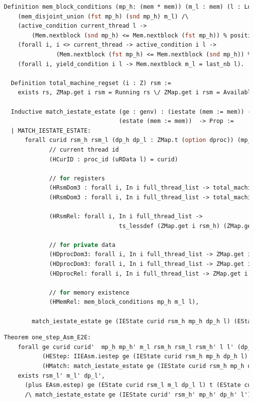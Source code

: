 \begin{lstlisting}[language=Caml]
  Definition mem_block_conditions (mp_h: (mem * mem)) (m_l : mem) (l : Log) : Prop :=
    (mem_disjoint_union (fst mp_h) (snd mp_h) m_l) /\
    (active_condition current_thread l -> 
        (Mem.nextblock (snd mp_h) <= Mem.nextblock (fst mp_h)) % positive) /\
    (forall i, i <> current_thread -> active_condition i l -> 
               (Mem.nextblock (fst mp_h) <= Mem.nextblock (snd mp_h)) % positive) /\
    (forall i, yield_condition i l -> Mem.nextblock m_l = last_nb l).
  
  Definition total_machine_regset (i : Z) rsm :=
    exists rs, ZMap.get i rsm = Running rs \/ ZMap.get i rsm = Available.

  Inductive match_iestate_estate (ge : genv) : (iestate (mem := mem)) -> 
                                 (estate (mem := mem))  -> Prop :=  
  | MATCH_IESTATE_ESTATE:
      forall curid rsm_h rsm_l (dp_h dp_l : ZMap.t (option dproc)) (mp_h: (mem * mem)) m_l l
             // current thread id 
             (HCurID : proc_id (uRData l) = curid)

             // for registers 
             (HRsmDom3 : forall i, In i full_thread_list -> total_machine_regset i rsm_h)
             (HRsmDom3 : forall i, In i full_thread_list -> total_machine_regset i rsm_l)
             
             (HRsmRel: forall i, In i full_thread_list ->
                                 ts_lessdef (ZMap.get i rsm_h) (ZMap.get i rsm_l))
             
             // for private data 
             (HDprocDom3: forall i, In i full_thread_list -> ZMap.get i dp_h <> None)
             (HDprocDom3: forall i, In i full_thread_list -> ZMap.get i dp_l <> None)
             (HDprocRel: forall i, In i full_thread_list -> ZMap.get i dp_h = ZMap.get i dp_l)

             // for memory existence 
             (HMemRel: mem_block_conditions mp_h m_l l),
        
        match_iestate_estate ge (IEState curid rsm_h mp_h dp_h l) (EState curid rsm_l m_l dp_l l).
\end{lstlisting}

\begin{lstlisting}[language=Caml]
  Theorem one_step_Asm_E2E:
    forall ge curid curid'  mp_h mp_h' m_l rsm_h rsm_l rsm_h' l l' (dp_h dp_l dp_h' : ZMap.t (option dproc)) t
           (HEStep: IIEAsm.iestep ge (IEState curid rsm_h mp_h dp_h l) t (IEState curid' rsm_h' mp_h' dp_h' l'))
           (HMatch: match_iestate_estate ge (IEState curid rsm_h mp_h dp_h l) (EState curid rsm_l m_l dp_l l)),
    exists rsm_l' m_l' dp_l',
      (plus EAsm.estep) ge (EState curid rsm_l m_l dp_l l) t (EState curid' rsm_l' m_l' dp_l' l')
      /\ match_iestate_estate ge (IEState curid' rsm_h' mp_h' dp_h' l') (EState curid' rsm_l' m_l' dp_l' l').
\end{lstlisting}

